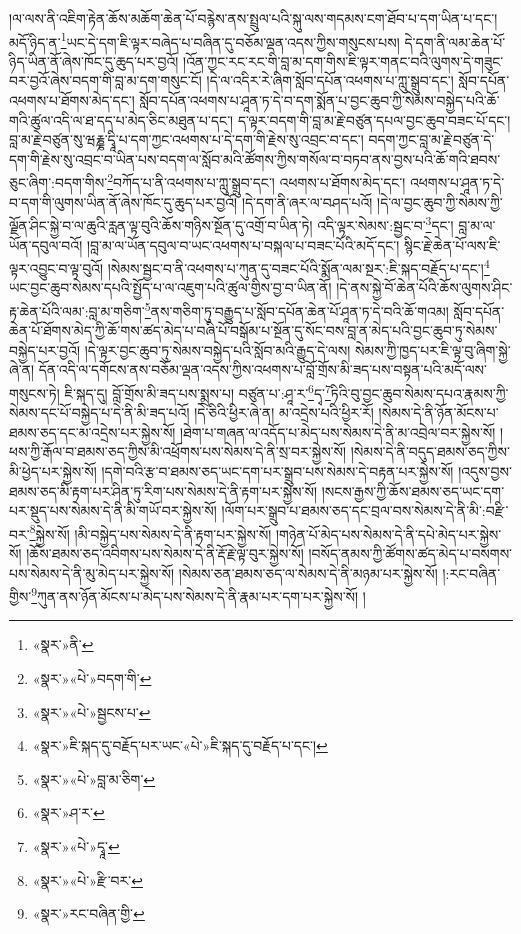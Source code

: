 །ལ་ལས་ནི་འཇིག་རྟེན་ཆོས་མཆོག་ཆེན་པོ་བརྙེས་ནས་སྤྲུལ་པའི་སྐུ་ལས་གདམས་ངག་ཐོབ་པ་དག་ཡིན་པ་དང་། མདོ་ཉིད་ན་\footnote{«སྣར་»ནི་}ཡང་དེ་དག་ཇི་ལྟར་བཞེད་པ་བཞིན་དུ་བཅོམ་ལྡན་འདས་ཀྱིས་གསུངས་པས། དེ་དག་ནི་ལམ་ཆེན་པོ་ཉིད་ཡིན་ནོ་ཞེས་ཁོང་དུ་ཆུད་པར་བྱའོ། །འོན་ཀྱང་རང་རང་གི་བླ་མ་དག་གིས་ཇི་ལྟར་གནང་བའི་ལུགས་དེ་གཟུང་བར་བྱའོ་ཞེས་བདག་གི་བླ་མ་དག་གསུང་ངོ། །དེ་ལ་འདིར་རེ་ཞིག་སློབ་དཔོན་འཕགས་པ་ཀླུ་སྒྲུབ་དང་། སློབ་དཔོན་འཕགས་པ་ཐོགས་མེད་དང་། སློབ་དཔོན་འཕགས་པ་ཤཱན་ཏ་དེ་བ་དག་སྨོན་པ་བྱང་ཆུབ་ཀྱི་སེམས་བསྐྱེད་པའི་ཆོ་གའི་ཚུལ་འདི་ལ་ཐ་དད་པ་མེད་ཅིང་མཐུན་པ་དང་། ད་ལྟར་བདག་གི་བླ་མ་རྗེ་བཙུན་དཔལ་བྱང་ཆུབ་བཟང་པོ་དང་། བླ་མ་རྗེ་བཙུན་སུ་ཝརྞྞ་དྭཱི་པ་དག་ཀྱང་འཕགས་པ་དེ་དག་གི་རྗེས་སུ་འབྲང་བ་དང་། བདག་ཀྱང་བླ་མ་རྗེ་བཙུན་དེ་དག་གི་རྗེས་སུ་འབྲང་བ་ཡིན་པས་བདག་ལ་སློབ་མའི་ཚོགས་ཀྱིས་གསོལ་བ་བཏབ་ནས་བྱས་པའི་ཆོ་གའི་ཐབས་ཅུང་ཞིག་:བདག་གིས་\footnote{«སྣར་»«པེ་»བདག་གི་}བཀོད་པ་ནི་འཕགས་པ་ཀླུ་སྒྲུབ་དང་། འཕགས་པ་ཐོགས་མེད་དང་། འཕགས་པ་ཤཱན་ཏ་དེ་བ་དག་གི་ལུགས་ཡིན་ནོ་ཞེས་ཁོང་དུ་ཆུད་པར་བྱའོ། །དེ་དག་ནི་ཞར་ལ་བཤད་པའོ། །དེ་ལ་བྱང་ཆུབ་ཀྱི་སེམས་ཀྱི་ལྗོན་ཤིང་སྐྱེ་བ་ལ་ཆུའི་རླན་ལྟ་བུའི་ཆོས་གཉིས་སྔོན་དུ་འགྲོ་བ་ཡིན་ཏེ། འདི་ལྟར་སེམས་:སྦྱང་བ་\footnote{«སྣར་»«པེ་»སྦྱངས་པ་}དང་། བླ་མ་ལ་ཡོན་དབུལ་བའོ། །བླ་མ་ལ་ཡོན་དབུལ་བ་ཡང་འཕགས་པ་བསྐལ་པ་བཟང་པོའི་མདོ་དང་། སྙིང་རྗེ་ཆེན་པོ་ལས་ཇི་ལྟར་འབྱུང་བ་ལྟ་བུའོ། །སེམས་སྦྱང་བ་ནི་འཕགས་པ་ཀུན་དུ་བཟང་པོའི་སྨོན་ལམ་སྔར་:ཇི་སྐད་བརྗོད་པ་དང་།\footnote{«སྣར་»ཇི་སྐད་དུ་བརྗོད་པར་ཡང་«པེ་»ཇི་སྐད་དུ་བརྗོད་པ་དང་།} ཡང་བྱང་ཆུབ་སེམས་དཔའི་སྤྱོད་པ་ལ་འཇུག་པའི་ཚུལ་གྱིས་བྱ་བ་ཡིན་ནོ། །དེ་ནས་སྐྱེ་བོ་ཆེན་པོའི་ཆོས་ལུགས་ཤིང་རྟ་ཆེན་པོའི་ལམ་:བླ་མ་གཅིག་\footnote{«སྣར་»«པེ་»བླ་མ་ཅིག་}ནས་གཅིག་ཏུ་བརྒྱུད་པ་སློབ་དཔོན་ཆེན་པོ་ཤཱན་ཏ་དེ་བའི་ཆོ་གའམ། སློབ་དཔོན་ཆེན་པོ་ཐོགས་མེད་ཀྱི་ཆོ་གས་ཚད་མེད་པ་བཞི་པོ་བསྒོམ་པ་སྔོན་དུ་སོང་བས་བླ་ན་མེད་པའི་བྱང་ཆུབ་ཏུ་སེམས་བསྐྱེད་པར་བྱའོ། །དེ་ལྟར་བྱང་ཆུབ་ཏུ་སེམས་བསྐྱེད་པའི་སློབ་མའི་རྒྱུད་དེ་ལས། སེམས་ཀྱི་ཁྱད་པར་ཇི་ལྟ་བུ་ཞིག་སྐྱེ་ཞེ་ན། དོན་འདི་ལ་དགོངས་ནས་བཅོམ་ལྡན་འདས་ཀྱིས་འཕགས་པ་བློ་གྲོས་མི་ཟད་པས་བསྟན་པའི་མདོ་ལས་གསུངས་ཏེ། ཇི་སྐད་དུ། བློ་གྲོས་མི་ཟད་པས་སྨྲས་པ། བཙུན་པ་:ཤཱ་ར་\footnote{«སྣར་»ཤ་ར་}དྭ་\footnote{«སྣར་»«པེ་»དྭཱ་}ཏིའི་བུ་བྱང་ཆུབ་སེམས་དཔའ་རྣམས་ཀྱི་སེམས་དང་པོ་བསྐྱེད་པ་དེ་ནི་མི་ཟད་པའོ། །དེ་ཅིའི་ཕྱིར་ཞེ་ན། མ་འདྲེས་པའི་ཕྱིར་རོ། །སེམས་དེ་ནི་ཉོན་མོངས་པ་ཐམས་ཅད་དང་མ་འདྲེས་པར་སྐྱེས་སོ། །ཐེག་པ་གཞན་ལ་འདོད་པ་མེད་པས་སེམས་དེ་ནི་མ་འབྲེལ་བར་སྐྱེས་སོ། །ཕས་ཀྱི་རྒོལ་བ་ཐམས་ཅད་ཀྱིས་མི་འཕྲོགས་པས་སེམས་དེ་ནི་སྲ་བར་སྐྱེས་སོ། །སེམས་དེ་ནི་བདུད་ཐམས་ཅད་ཀྱིས་མི་ཕྱེད་པར་སྐྱེས་སོ། །དགེ་བའི་རྩ་བ་ཐམས་ཅད་ཡང་དག་པར་སྒྲུབ་པས་སེམས་དེ་བརྟན་པར་སྐྱེས་སོ། །འདུས་བྱས་ཐམས་ཅད་མི་རྟག་པར་ཤིན་ཏུ་རིག་པས་སེམས་དེ་ནི་རྟག་པར་སྐྱེས་སོ། །སངས་རྒྱས་ཀྱི་ཆོས་ཐམས་ཅད་ཡང་དག་པར་སྡུད་པས་སེམས་དེ་ནི་མི་གཡོ་བར་སྐྱེས་སོ། །ལོག་པར་སྒྲུབ་པ་ཐམས་ཅད་དང་བྲལ་བས་སེམས་དེ་ནི་མི་:བརྫི་བར་\footnote{«སྣར་»«པེ་»རྫི་བར་}སྐྱེས་སོ། །མི་བསྐྱེད་པས་སེམས་དེ་ནི་རྟག་པར་སྐྱེས་སོ། །གཉེན་པོ་མེད་པས་སེམས་དེ་ནི་དཔེ་མེད་པར་སྐྱེས་སོ། །ཆོས་ཐམས་ཅད་འབིགས་པས་སེམས་དེ་ནི་རྡོ་རྗེ་ལྟ་བུར་སྐྱེས་སོ། །བསོད་ནམས་ཀྱི་ཚོགས་ཚད་མེད་པ་བསགས་པས་སེམས་དེ་ནི་མུ་མེད་པར་སྐྱེས་སོ། །སེམས་ཅན་ཐམས་ཅད་ལ་སེམས་དེ་ནི་མཉམ་པར་སྐྱེས་སོ། །:རང་བཞིན་གྱིས་\footnote{«སྣར་»རང་བཞིན་གྱི་}ཀུན་ནས་ཉོན་མོངས་པ་མེད་པས་སེམས་དེ་ནི་རྣམ་པར་དག་པར་སྐྱེས་སོ། །
